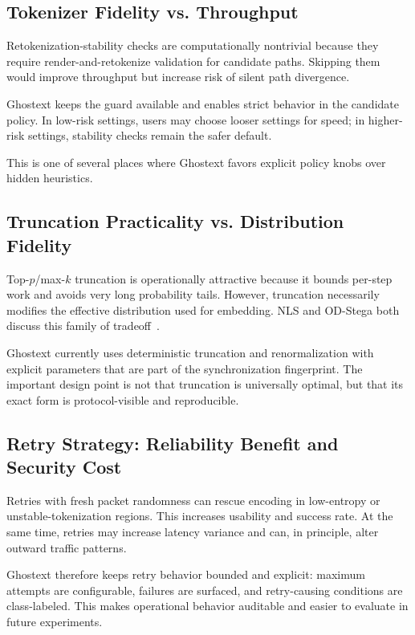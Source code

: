 \subsection{Tokenizer Fidelity vs. Throughput}

Retokenization-stability checks are computationally nontrivial because they require render-and-retokenize validation for candidate paths. Skipping them would improve throughput but increase risk of silent path divergence.

Ghostext keeps the guard available and enables strict behavior in the candidate policy. In low-risk settings, users may choose looser settings for speed; in higher-risk settings, stability checks remain the safer default.

This is one of several places where Ghostext favors explicit policy knobs over hidden heuristics.

\subsection{Truncation Practicality vs. Distribution Fidelity}

Top-$p$/max-$k$ truncation is operationally attractive because it bounds per-step work and avoids very long probability tails. However, truncation necessarily modifies the effective distribution used for embedding. NLS and OD-Stega both discuss this family of tradeoff~\cite{ziegler2019neural,huang2026odstega}.

Ghostext currently uses deterministic truncation and renormalization with explicit parameters that are part of the synchronization fingerprint. The important design point is not that truncation is universally optimal, but that its exact form is protocol-visible and reproducible.

\subsection{Retry Strategy: Reliability Benefit and Security Cost}

Retries with fresh packet randomness can rescue encoding in low-entropy or unstable-tokenization regions. This increases usability and success rate. At the same time, retries may increase latency variance and can, in principle, alter outward traffic patterns.

Ghostext therefore keeps retry behavior bounded and explicit: maximum attempts are configurable, failures are surfaced, and retry-causing conditions are class-labeled. This makes operational behavior auditable and easier to evaluate in future experiments.

